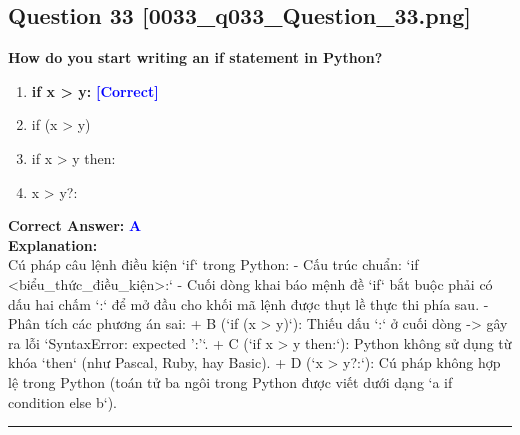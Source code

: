 \documentclass[11pt,a4paper]{article}
\begin{document}
\begin{minipage}{\textwidth}
\subsection*{Question 33 \quad \footnotesize{[0033_q033_Question_33.png]}}
\noindent \textbf{How do you start writing an if statement in Python?}

\begin{enumerate}[label=\Alph*.]
    \item \textbf{if x > y:} \hfill \textcolor{blue}{\textbf{[Correct]}}
    \item if (x > y)
    \item if x > y then:
    \item x > y?:
\end{enumerate}

\noindent \textbf{Correct Answer:} \textcolor{blue}{\textbf{A}} \\[4pt]
\noindent \textbf{Explanation:}\\
Cú pháp câu lệnh điều kiện `if` trong Python:\newline
- Cấu trúc chuẩn: `if <biểu_thức_điều_kiện>:`\newline
- Cuối dòng khai báo mệnh đề `if` bắt buộc phải có dấu hai chấm `:` để mở đầu cho khối mã lệnh được thụt lề thực thi phía sau.\newline
- Phân tích các phương án sai:\newline
  + B (`if (x > y)`): Thiếu dấu `:` ở cuối dòng -> gây ra lỗi `SyntaxError: expected ':'`.\newline
  + C (`if x > y then:`): Python không sử dụng từ khóa `then` (như Pascal, Ruby, hay Basic).\newline
  + D (`x > y?:`): Cú pháp không hợp lệ trong Python (toán tử ba ngôi trong Python được viết dưới dạng `a if condition else b`).
\end{minipage}
\vspace{0.8cm}
\hrule
\vspace{0.5cm}
\end{document}
